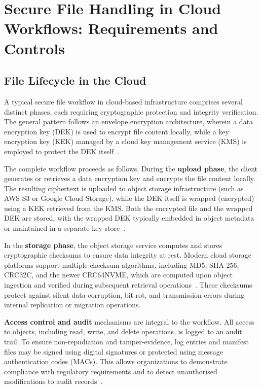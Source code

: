 \documentclass[12pt,a4paper]{article}
\begin{document}
\section{Secure File Handling in Cloud Workflows: Requirements and Controls}

\subsection{File Lifecycle in the Cloud}

A typical secure file workflow in cloud-based infrastructure comprises several distinct phases, each requiring cryptographic protection and integrity verification. The general pattern follows an envelope encryption architecture, wherein a data encryption key (DEK) is used to encrypt file content locally, while a key encryption key (KEK) managed by a cloud key management service (KMS) is employed to protect the DEK itself~\cite{aws-mlkem-deployment-2025}.

The complete workflow proceeds as follows. During the \textbf{upload phase}, the client generates or retrieves a data encryption key and encrypts the file content locally. The resulting ciphertext is uploaded to object storage infrastructure (such as AWS S3 or Google Cloud Storage), while the DEK itself is wrapped (encrypted) using a KEK retrieved from the KMS. Both the encrypted file and the wrapped DEK are stored, with the wrapped DEK typically embedded in object metadata or maintained in a separate key store~\cite{aws-mlkem-deployment-2025}.

In the \textbf{storage phase}, the object storage service computes and stores cryptographic checksums to ensure data integrity at rest. Modern cloud storage platforms support multiple checksum algorithms, including MD5, SHA-256, CRC32C, and the newer CRC64NVME, which are computed upon object ingestion and verified during subsequent retrieval operations~\cite{aws-s3-checksums-2024,aws-s3-crc64-2024}. These checksums protect against silent data corruption, bit rot, and transmission errors during internal replication or migration operations.

\textbf{Access control and audit} mechanisms are integral to the workflow. All access to objects, including read, write, and delete operations, is logged to an audit trail. To ensure non-repudiation and tamper-evidence, log entries and manifest files may be signed using digital signatures or protected using message authentication codes (MACs). This allows organizations to demonstrate compliance with regulatory requirements and to detect unauthorised modifications to audit records~\cite{aws-cloudtrail-integrity-2023}.
\end{document}
